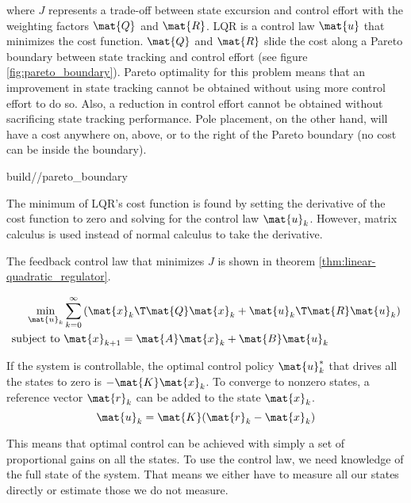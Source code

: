 where $J$ represents a trade-off between \gls{state} excursion and
\gls{control effort} with the weighting factors $\mat{Q}$ and $\mat{R}$. LQR is
a \gls{control law} $\mat{u}$ that minimizes the cost function. $\mat{Q}$ and
$\mat{R}$ slide the cost along a Pareto boundary between state tracking and
\gls{control effort} (see figure \ref{fig:pareto_boundary}). Pareto optimality
for this problem means that an improvement in state \gls{tracking} cannot be
obtained without using more \gls{control effort} to do so. Also, a reduction in
\gls{control effort} cannot be obtained without sacrificing state \gls{tracking}
performance. Pole placement, on the other hand, will have a cost anywhere on,
above, or to the right of the Pareto boundary (no cost can be inside the
boundary).
\begin{svg}{build/\chapterpath/pareto_boundary}
  \caption{Pareto boundary for LQR}
  \label{fig:pareto_boundary}
\end{svg}

The minimum of LQR's cost function is found by setting the derivative of the
cost function to zero and solving for the \gls{control law} $\mat{u}_k$.
However, matrix calculus is used instead of normal calculus to take the
derivative.

The feedback \gls{control law} that minimizes $J$ is shown in theorem
\ref{thm:linear-quadratic_regulator}.
\begin{theorem}
  \label{thm:linear-quadratic_regulator}
  \begin{align}
    \min_{\mat{u}_k} &\sum\limits_{k=0}^\infty
      \left(\mat{x}_k\T\mat{Q}\mat{x}_k + \mat{u}_k\T\mat{R}\mat{u}_k\right)
      \nonumber \\
    \text{subject to } &\mat{x}_{k+1} = \mat{A}\mat{x}_k + \mat{B}\mat{u}_k
  \end{align}

  If the \gls{system} is controllable, the optimal control policy $\mat{u}_k^*$
  that drives all the \glspl{state} to zero is $-\mat{K}\mat{x}_k$. To converge
  to nonzero \glspl{state}, a \gls{reference} vector $\mat{r}_k$ can be added to
  the \gls{state} $\mat{x}_k$.
  \begin{equation}
    \mat{u}_k = \mat{K}(\mat{r}_k - \mat{x}_k)
  \end{equation}
\end{theorem}

This means that optimal control can be achieved with simply a set of
proportional gains on all the \glspl{state}. To use the \gls{control law}, we
need knowledge of the full \gls{state} of the \gls{system}. That means we either
have to measure all our \glspl{state} directly or estimate those we do not
measure.

